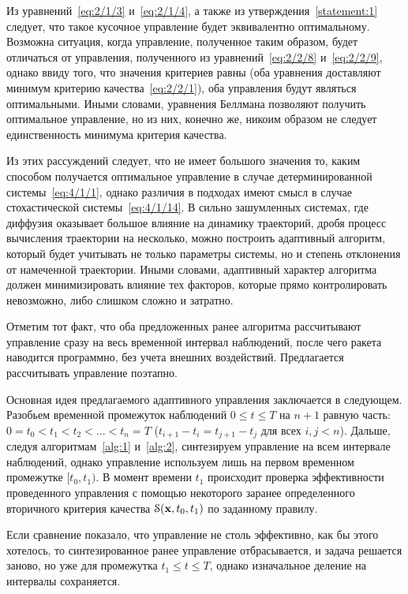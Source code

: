 Из уравнений~\ref{eq:2/1/3} и~\ref{eq:2/1/4}, а также из утверждения~\vref{statement:1} следует, что такое кусочное управление будет эквивалентно оптимальному. Возможна ситуация, когда управление, полученное таким образом, будет отличаться от управления, полученного из уравнений~\ref{eq:2/2/8} и~\vref{eq:2/2/9}, однако ввиду того, что значения критериев равны (оба уравнения доставляют минимум критерию качества~\vref{eq:2/2/1}), оба управления будут являться оптимальными. Иными словами, уравнения Беллмана позволяют получить оптимальное управление, но из них, конечно же, никоим образом не следует единственность минимума критерия качества.

Из этих рассуждений следует, что не имеет большого значения то, каким способом получается оптимальное управление в случае детерминированной системы~\vref{eq:4/1/1}, однако различия в подходах имеют смысл в случае стохастической системы~\vref{eq:4/1/14}. В сильно зашумленных системах, где диффузия оказывает большое влияние на динамику траекторий, дробя процесс вычисления траектории на несколько, можно построить адаптивный алгоритм, который будет учитывать не только параметры системы, но и степень отклонения от намеченной траектории. Иными словами, адаптивный характер алгоритма должен минимизировать влияние тех факторов, которые прямо контролировать невозможно, либо слишком сложно и затратно.

Отметим тот факт, что оба предложенных ранее алгоритма рассчитывают управление сразу на весь временной интервал наблюдений, после чего ракета наводится программно, без учета внешних воздействий. Предлагается рассчитывать управление поэтапно.

\br

Основная идея предлагаемого адаптивного управления заключается в следующем. Разобьем временной промежуток наблюдений $0 \leqslant t \leqslant T$ на $n+1$ равную часть: $0 = t_0 < t_1 < t_2 < \ldots < t_{n} = T$ ($t_{i+1}-t_i = t_{j+1}-t_j$ для всех $i, j < n$). Дальше, следуя алгоритмам~\ref{alg:1} и~\ref{alg:2}, синтезируем управление на всем интервале наблюдений, однако управление используем лишь на первом временном промежутке $[t_0, t_1)$. В момент времени $t_1$ происходит проверка эффективности проведенного управления с помощью некоторого заранее определенного вторичного критерия качества $\mathcal{S}(\mathbf{x}, t_0, t_1)$ по заданному правилу.

Если сравнение показало, что управление не столь эффективно, как бы этого хотелось, то синтезированное ранее управление отбрасывается, и задача решается заново, но уже для промежутка $t_1 \leqslant t \leqslant T$, однако изначальное деление на интервалы сохраняется.

